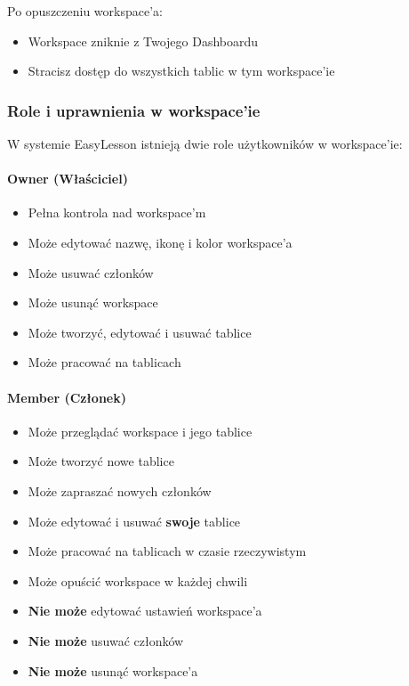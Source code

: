 \documentclass[12pt,a4paper]{article}
\begin{document}
Po opuszczeniu workspace'a:
\begin{itemize}
    \item Workspace zniknie z Twojego Dashboardu
    \item Stracisz dostęp do wszystkich tablic w tym workspace'ie
\end{itemize}

\subsubsection{Role i uprawnienia w workspace'ie}

W systemie EasyLesson istnieją dwie role użytkowników w workspace'ie:

\paragraph{Owner (Właściciel)}
\begin{itemize}
    \item Pełna kontrola nad workspace'm
    \item Może edytować nazwę, ikonę i kolor workspace'a
    \item Może usuwać członków
    \item Może usunąć workspace
    \item Może tworzyć, edytować i usuwać tablice
    \item Może pracować na tablicach
\end{itemize}

\paragraph{Member (Członek)}
\begin{itemize}
    \item Może przeglądać workspace i jego tablice
    \item Może tworzyć nowe tablice
    \item Może zapraszać nowych członków
    \item Może edytować i usuwać \textbf{swoje} tablice
    \item Może pracować na tablicach w czasie rzeczywistym
    \item Może opuścić workspace w każdej chwili
    \item \textbf{Nie może} edytować ustawień workspace'a
    \item \textbf{Nie może} usuwać członków
    \item \textbf{Nie może} usunąć workspace'a
\end{itemize}
\end{document}
